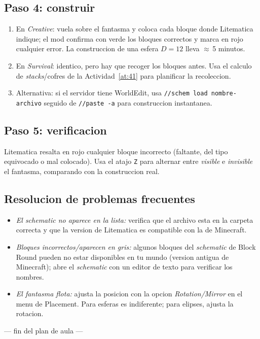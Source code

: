 \documentclass[12pt,a4paper]{scrartcl}
\newcommand{\cmd}[1]{\textcolor{earth}{\texttt{\small #1}}}
\begin{document}
\subsection{Paso 4: construir}
\begin{enumerate}[leftmargin=1.5em,itemsep=0.15em,topsep=0.3em]
  \item En \emph{Creative}: vuela sobre el fantasma y coloca cada bloque donde Litematica indique; el mod confirma con verde los bloques correctos y marca en rojo cualquier error. La construccion de una esfera $D = 12$ lleva $\approx$\,5 minutos.
  \item En \emph{Survival}: identico, pero hay que recoger los bloques antes. Usa el calculo de \emph{stacks}/cofres de la Actividad~\ref{at:41} para planificar la recoleccion.
  \item Alternativa: si el servidor tiene WorldEdit, usa \cmd{//schem load nombre-archivo} seguido de \cmd{//paste -a} para construccion instantanea.
\end{enumerate}

\subsection{Paso 5: verificacion}
Litematica resalta en rojo cualquier bloque incorrecto (faltante, del tipo equivocado o mal colocado). Usa el atajo \texttt{Z} para alternar entre \emph{visible} e \emph{invisible} el fantasma, comparando con la construccion real.

\subsection{Resolucion de problemas frecuentes}
\begin{itemize}[leftmargin=1.3em,itemsep=0.15em,topsep=0.3em,nosep]
  \item \emph{El schematic no aparece en la lista:} verifica que el archivo esta en la carpeta correcta y que la version de Litematica es compatible con la de Minecraft.
  \item \emph{Bloques incorrectos/aparecen en gris:} algunos bloques del \emph{schematic} de Block Round pueden no estar disponibles en tu mundo (version antigua de Minecraft); abre el \emph{schematic} con un editor de texto para verificar los nombres.
  \item \emph{El fantasma flota:} ajusta la posicion con la opcion \emph{Rotation/Mirror} en el menu de Placement. Para esferas es indiferente; para elipses, ajusta la rotacion.
\end{itemize}

\vspace{2em}
\begin{center}
\color{muted}\small\sffamily
--- fin del plan de aula ---
\end{center}
\end{document}
